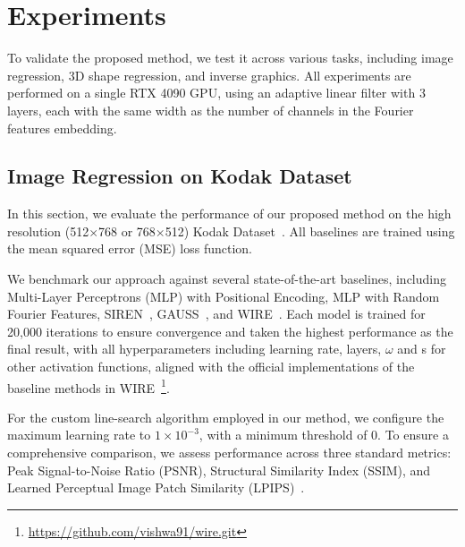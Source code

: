 \section{Experiments}
To validate the proposed method, we test it across various tasks, including image regression, 3D shape regression, and inverse graphics. All experiments are performed on a single RTX 4090 GPU, using an adaptive linear filter with 3 layers, each with the same width as the number of channels in the Fourier features embedding.
\subsection{Image Regression on Kodak Dataset}
In this section, we evaluate the performance of our proposed method on the high resolution (512$\times$768 or 768$\times$512) Kodak Dataset~\citep{article}. All baselines are trained using the mean squared error (MSE) loss function.

We benchmark our approach against several state-of-the-art baselines, including Multi-Layer Perceptrons (MLP) with Positional Encoding, MLP with Random Fourier Features, SIREN~\citep{sitzmann2020implicit}, GAUSS~\citep{ramasinghe2022beyond}, and WIRE~\citep{saragadam2023wire}. Each model is trained for 20,000 iterations to ensure convergence and taken the highest performance as the final result, with all hyperparameters including learning rate, layers, $\omega$ and s for other activation functions, aligned with the official implementations of the baseline methods in WIRE~\footnote{\url{https://github.com/vishwa91/wire.git}}. 

For the custom line-search algorithm employed in our method, we configure the maximum learning rate to $1 \times 10^{-3}$, with a minimum threshold of 0. To ensure a comprehensive comparison, we assess performance across three standard metrics: Peak Signal-to-Noise Ratio (PSNR), Structural Similarity Index (SSIM), and Learned Perceptual Image Patch Similarity (LPIPS)~\citep{zhang2018unreasonable}.

